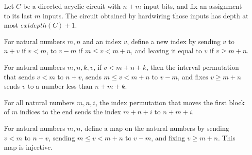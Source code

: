 \begin{theorem}
\label{BoolCircuit.DAGCircuit.hardwire_depth_le}
\leanok
{}
Let $C$ be a directed acyclic circuit with $n+m$ input bits, and fix an assignment to
its last $m$ inputs. The circuit obtained by hardwiring those inputs has depth at most
$	ext{depth}(C)+1$.
\end{theorem}

\begin{definition}
\label{BoolCircuit.DAGCircuit.leftPerm}
\leanok
For natural numbers $m,n$ and an index $v$, define a new index by sending $v$ to $n+v$
if $v<m$, to $v-m$ if $m\le v<m+n$, and leaving it equal to $v$ if $v\ge m+n$.
\end{definition}

\begin{theorem}
\label{BoolCircuit.DAGCircuit.leftPerm_lt}
\leanok
{}
For natural numbers $m,n,k,v$, if $v<m+n+k$, then the interval permutation that sends
$v<m$ to $n+v$, sends $m\le v<m+n$ to $v-m$, and fixes $v\ge m+n$ sends $v$ to a number
less than $n+m+k$.
\end{theorem}

\begin{theorem}
\label{BoolCircuit.DAGCircuit.leftPerm_gate}
\leanok
{}
For all natural numbers $m,n,i$, the index permutation that moves the first block of $m$
indices to the end sends the index $m+n+i$ to $n+m+i$.
\end{theorem}

\begin{theorem}
\label{BoolCircuit.DAGCircuit.leftPerm_injective}
\leanok
{}
For natural numbers $m,n$, define a map on the natural numbers by sending $v<m$ to
$n+v$, sending $m\le v<m+n$ to $v-m$, and fixing $v\ge m+n$. This map is injective.
\end{theorem}

